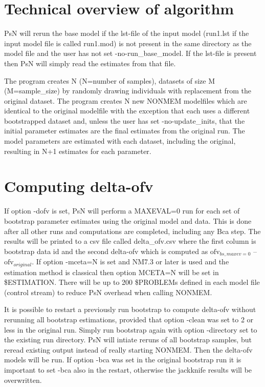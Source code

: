 \section{Technical overview of algorithm}

PsN will rerun the base model if the lst-file of the input model (run1.lst if the input model file is called run1.mod) is not present in the same directory as the model file 
and the user has not set -no-run\_base\_model. If the lst-file is present then PsN will simply read the estimates from that file.

The program creates N (N=number of samples), datasets of size M (M=sample\_size) by randomly drawing individuals with replacement from the original dataset. The program creates N new NONMEM modelfiles which are identical to the original modelfile with the exception that each uses a different  bootstrapped dataset and, 
unless the user has set -no-update\_inits,
that the initial parameter estimates are the final estimates from the original run. 
The model parameters are estimated with each dataset, including the original, resulting in N+1 estimates for each parameter.

\section{Computing delta-ofv}

If option -dofv is set, PsN will perform a MAXEVAL=0 run for each set of bootstrap parameter estimates using the original model and data. This is done after all other runs and computations are completed, including any Bca step. The results will be printed to a csv file called delta\_ofv.csv where the first column is bootstrap data id and the second delta-ofv which is computed as 
$\mathrm{ofv}_{bs,maxev=0}$ – $\mathrm{ofv}_{original}$. If option -mceta=N is set and NM7.3 or later is used and the estimation method is classical then option MCETA=N will be set in \$ESTIMATION. There will be up to 200 \$PROBLEMs defined in each model file (control stream) to reduce PsN overhead when calling NONMEM.

It is possible to restart a previously run bootstrap to compute delta-ofv without rerunning all bootstrap estimations, provided that option -clean was set to 2 or less in the original run. Simply run bootstrap again with option -directory set to the existing run directory. PsN will intiate reruns of all bootstrap samples, but reread existing output instead of really starting NONMEM. Then the delta-ofv models will be run. If option -bca was set in the original bootstrap run it is important to set -bca also in the restart, otherwise the jackknife results will be overwritten. 

